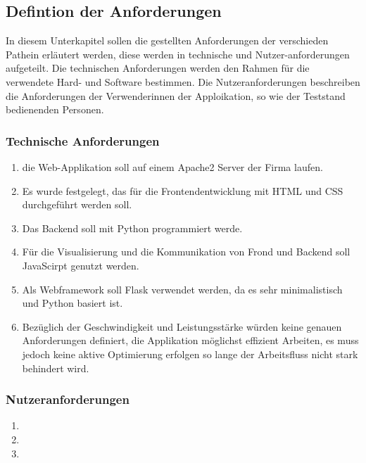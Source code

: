 \subsection{Defintion der Anforderungen}
\label{subsec:defintion-der-anforderungen}

In diesem Unterkapitel sollen die gestellten Anforderungen der verschieden Pathein erläutert werden, diese werden in technische und Nutzer-anforderungen aufgeteilt.
Die technischen Anforderungen werden den Rahmen für die verwendete Hard- und Software bestimmen.
Die Nutzeranforderungen beschreiben die Anforderungen der Verwenderinnen der Apploikation, so wie der Teststand bedienenden Personen.

\subsubsection{Technische Anforderungen}


\begin{enumerate}

    \item die Web-Applikation soll auf einem Apache2 Server der Firma laufen.
    \item Es wurde festgelegt, das für die Frontendentwicklung mit HTML und CSS durchgeführt werden soll.
    \item Das Backend soll mit Python programmiert werde.
    \item Für die Visualisierung und die Kommunikation von Frond und Backend soll JavaScirpt genutzt werden.
    \item Als Webframework soll Flask verwendet werden, da es sehr minimalistisch und Python basiert ist.
    \item Bezüglich der Geschwindigkeit und Leistungsstärke würden keine genauen Anforderungen definiert,
    die Applikation möglichst effizient Arbeiten, es muss jedoch keine aktive Optimierung erfolgen so
    lange der Arbeitsfluss nicht stark behindert wird.
\end{enumerate}

\subsubsection{Nutzeranforderungen}

\begin{enumerate}

    \item
    \item
    \item

\end{enumerate}
